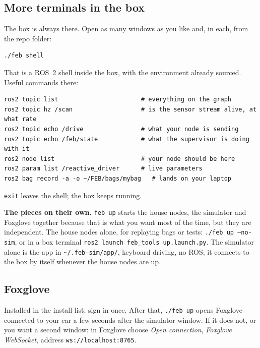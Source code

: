 \subsection*{More terminals in the box}

The box is always there. Open as many \OSterm{} windows as you like and, in each, from the repo
folder:

\begin{lstlisting}
./feb shell
\end{lstlisting}

That is a ROS~2 shell inside the box, with the environment already sourced. Useful commands there:

\begin{lstlisting}
ros2 topic list                       # everything on the graph
ros2 topic hz /scan                   # is the sensor stream alive, at what rate
ros2 topic echo /drive                # what your node is sending
ros2 topic echo /feb/state            # what the supervisor is doing with it
ros2 node list                        # your node should be here
ros2 param list /reactive_driver      # live parameters
ros2 bag record -a -o ~/FEB/bags/mybag   # lands on your laptop
\end{lstlisting}

\texttt{exit} leaves the shell; the box keeps running.

\textbf{The pieces on their own.} \texttt{feb up} starts the house nodes, the simulator and
Foxglove together because that is what you want most of the time, but they are independent.
The house nodes alone, for replaying bags or tests: \texttt{./feb up --no-sim}, or in a box
terminal \texttt{ros2 launch feb\_tools up.launch.py}. The simulator alone is the app in
\texttt{\textasciitilde/.feb-sim/app/\OSappdir}, keyboard driving, no ROS; it connects to the
box by itself whenever the house nodes are up.

\subsection*{Foxglove}

Installed in the install list; sign in once. After that, \texttt{./feb up} opens
Foxglove connected to your car a few seconds after the simulator window. If it does not, or
you want a second window: in Foxglove choose \emph{Open connection}, \emph{Foxglove WebSocket},
address \texttt{ws://localhost:8765}.

